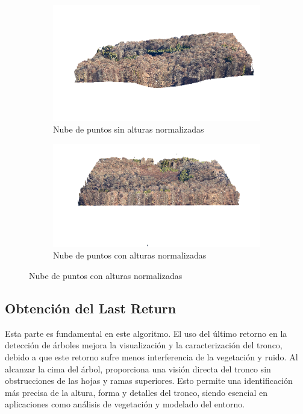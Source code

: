 \begin{figure}[h]
  \begin{subfigure}{0.5\textwidth}
    \centering
    \includegraphics[width=0.8\linewidth]{imaxes/nohag.png}
    \caption{Nube de puntos sin alturas normalizadas}
    \label{fig:sub1}
  \end{subfigure}%
  \begin{subfigure}{0.5\textwidth}
    \centering
    \includegraphics[width=0.8\linewidth]{imaxes/hag.png}
    \caption{Nube de puntos con alturas normalizadas}
    \label{fig:sub2}
  \end{subfigure}
  \label{fig:algo1}
\end{figure}

\subsection{Obtención del Last Return}
\label{chap:LastAlgo}

Esta parte es fundamental en este algoritmo. El uso del último retorno en la detección de árboles mejora la visualización y la caracterización del tronco, debido a que este retorno sufre menos interferencia de la vegetación y ruido. Al alcanzar la cima del árbol, proporciona una visión directa del tronco sin obstrucciones de las hojas y ramas superiores. Esto permite una identificación más precisa de la altura, forma y detalles del tronco, siendo esencial en aplicaciones como análisis de vegetación y modelado del entorno.

